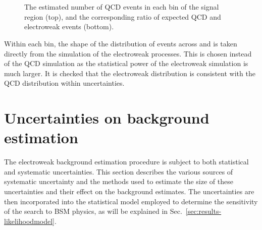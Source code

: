 \begin{figure}[!h]
\centering
{}
 \\
 \\
\caption{The estimated number of QCD events in each \njht bin of the signal 
region (top), and the corresponding ratio of expected QCD and electroweak 
events (bottom).}
\label{fig:qcdestimation}
\end{figure}

Within each \njht bin, the shape of the distribution of events across \nb and 
\mht is taken directly from the simulation of the electroweak processes. This 
is chosen instead of the QCD simulation as the statistical power of the 
electroweak simulation is much larger. It is checked that the electroweak 
\nbmht distribution is consistent with the QCD distribution within 
uncertainties.




\section{Uncertainties on background estimation}
\label{sec:analysis-systematics}
The electroweak background estimation procedure is subject to both statistical 
and 
systematic uncertainties. This section describes the various sources of 
systematic uncertainty and the methods used to estimate the size of these 
uncertainties and their effect on the background estimates. The uncertainties 
are then incorporated into the statistical model employed to determine the 
sensitivity of the search to BSM physics, as will be explained in 
Sec.~\ref{sec:results-likelihoodmodel}.

